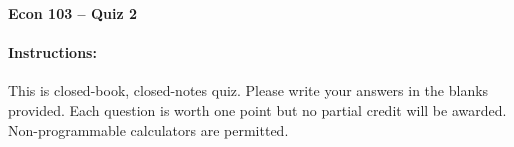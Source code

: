 \documentclass[addpoints,10pt]{exam}
\begin{document}
\thispagestyle{empty}

\noindent \textbf{Econ 103 -- Quiz 2}

\vspace{15pt}
\noindent
{}

\paragraph{Instructions: } This is closed-book, closed-notes quiz. Please write your answers in the blanks provided. Each question is worth one point but no partial credit will be awarded. Non-programmable calculators are permitted.

\vspace{5pt}

\setlength\answerlinelength{2in}
\end{document}
